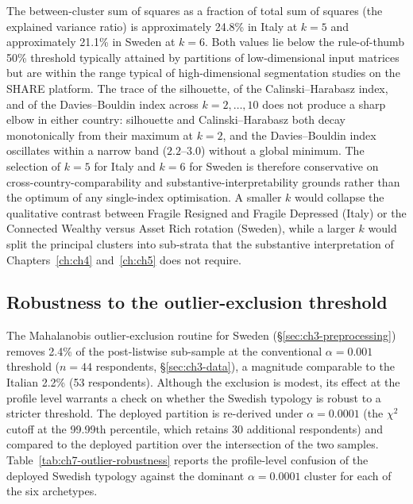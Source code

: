 The between-cluster sum of squares as a fraction of total sum of squares (the explained variance ratio) is approximately 24.8\% in Italy at $k = 5$ and approximately 21.1\% in Sweden at $k = 6$. Both values lie below the rule-of-thumb 50\% threshold typically attained by partitions of low-dimensional input matrices but are within the range typical of high-dimensional segmentation studies on the SHARE platform. The trace of the silhouette, of the Calinski--Harabasz index, and of the Davies--Bouldin index across $k = 2, \ldots, 10$ does not produce a sharp elbow in either country: silhouette and Calinski--Harabasz both decay monotonically from their maximum at $k = 2$, and the Davies--Bouldin index oscillates within a narrow band ($2.2$--$3.0$) without a global minimum. The selection of $k = 5$ for Italy and $k = 6$ for Sweden is therefore conservative on cross-country-comparability and substantive-interpretability grounds rather than the optimum of any single-index optimisation. A smaller $k$ would collapse the qualitative contrast between Fragile Resigned and Fragile Depressed (Italy) or the Connected Wealthy versus Asset Rich rotation (Sweden), while a larger $k$ would split the principal clusters into sub-strata that the substantive interpretation of Chapters~\ref{ch:ch4} and~\ref{ch:ch5} does not require.

\subsection{Robustness to the outlier-exclusion threshold}
\label{sec:ch7-outlier-robustness}

The Mahalanobis outlier-exclusion routine for Sweden (\S\ref{sec:ch3-preprocessing}) removes 2.4\% of the post-listwise sub-sample at the conventional $\alpha = 0.001$ threshold ($n = 44$ respondents, \S\ref{sec:ch3-data}), a magnitude comparable to the Italian 2.2\% (53 respondents). Although the exclusion is modest, its effect at the profile level warrants a check on whether the Swedish typology is robust to a stricter threshold. The deployed partition is re-derived under $\alpha = 0.0001$ (the $\chi^2$ cutoff at the 99.99th percentile, which retains 30 additional respondents) and compared to the deployed partition over the intersection of the two samples. Table~\ref{tab:ch7-outlier-robustness} reports the profile-level confusion of the deployed Swedish typology against the dominant $\alpha = 0.0001$ cluster for each of the six archetypes.

